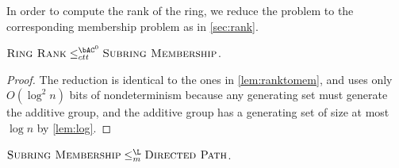 In order to compute the rank of the ring, we reduce the problem to the corresponding membership problem as in \autoref{sec:rank}.

\begin{lemma}\label{lem:ringranktomem}
  $\textsc{Ring Rank} \leq_{ctt}^{\bAC^0} \textsc{Subring Membership}$.
\end{lemma}
\begin{proof}
  The reduction is identical to the ones in \autoref{lem:ranktomem}, and uses only $O(\log^2 n)$ bits of nondeterminism because any generating set must generate the additive group, and the additive group has a generating set of size at most $\log n$ by \autoref{lem:log}.
\end{proof}

\begin{lemma}\label{lem:memtopath}
  $\textsc{Subring Membership} \leq_m^{\L} \textsc{Directed Path}$.
\end{lemma}
